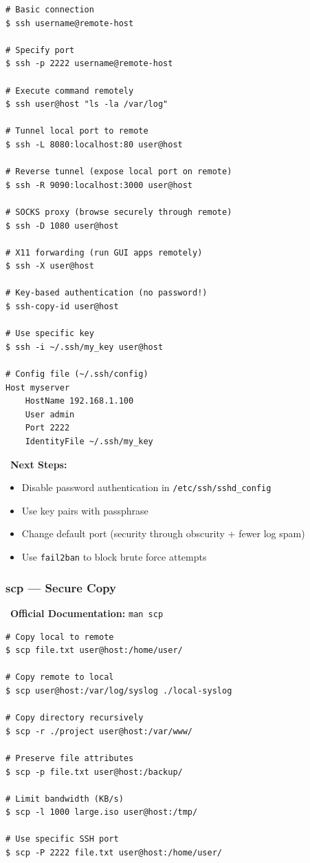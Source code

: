 \documentclass[12pt]{article}
\newcommand{\tipsicon}{\faLightbulb}
\newcommand{\bookicon}{\faBook}
\begin{document}
\begin{highlightbox}
\begin{verbatim}
# Basic connection
$ ssh username@remote-host

# Specify port
$ ssh -p 2222 username@remote-host

# Execute command remotely
$ ssh user@host "ls -la /var/log"

# Tunnel local port to remote
$ ssh -L 8080:localhost:80 user@host

# Reverse tunnel (expose local port on remote)
$ ssh -R 9090:localhost:3000 user@host

# SOCKS proxy (browse securely through remote)
$ ssh -D 1080 user@host

# X11 forwarding (run GUI apps remotely)
$ ssh -X user@host

# Key-based authentication (no password!)
$ ssh-copy-id user@host

# Use specific key
$ ssh -i ~/.ssh/my_key user@host

# Config file (~/.ssh/config)
Host myserver
    HostName 192.168.1.100
    User admin
    Port 2222
    IdentityFile ~/.ssh/my_key
\end{verbatim}
\end{highlightbox}

\begin{infobox}
\tipsicon\ \textbf{Next Steps:}
\begin{itemize}
    \item Disable password authentication in \texttt{/etc/ssh/sshd\_config}
    \item Use key pairs with passphrase
    \item Change default port (security through obscurity + fewer log spam)
    \item Use \texttt{fail2ban} to block brute force attempts
\end{itemize}
\end{infobox}

\subsubsection*{scp — Secure Copy}

\begin{infobox}
\bookicon\ \textbf{Official Documentation:} \texttt{man scp}
\end{infobox}

\begin{highlightbox}
\begin{verbatim}
# Copy local to remote
$ scp file.txt user@host:/home/user/

# Copy remote to local
$ scp user@host:/var/log/syslog ./local-syslog

# Copy directory recursively
$ scp -r ./project user@host:/var/www/

# Preserve file attributes
$ scp -p file.txt user@host:/backup/

# Limit bandwidth (KB/s)
$ scp -l 1000 large.iso user@host:/tmp/

# Use specific SSH port
$ scp -P 2222 file.txt user@host:/home/user/
\end{verbatim}
\end{highlightbox}
\end{document}
